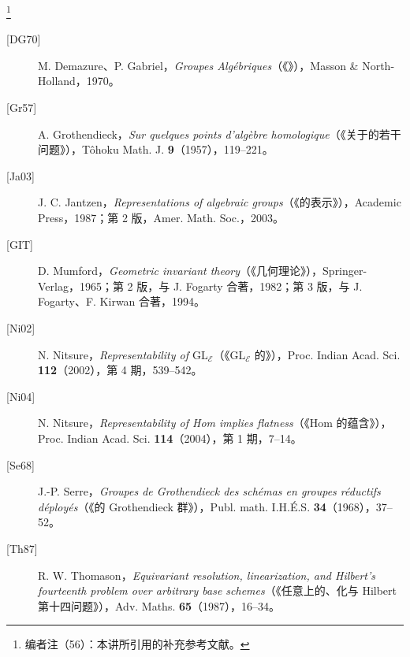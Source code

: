 \footnote{编者注（56）：本讲所引用的补充参考文献。}
\begin{description}
\item[{[DG70]}] M. Demazure、P. Gabriel，\emph{Groupes Algébriques}（《》），Masson \& North-Holland，1970。
\item[{[Gr57]}] A. Grothendieck，\emph{Sur quelques points d'algèbre homologique}（《关于的若干问题》），Tôhoku Math. J. \textbf{9}（1957），119--221。
\item[{[Ja03]}] J. C. Jantzen，\emph{Representations of algebraic groups}（《的表示》），Academic Press，1987；第 2 版，Amer. Math. Soc.，2003。
\item[{[GIT]}] D. Mumford，\emph{Geometric invariant theory}（《几何理论》），Springer-Verlag，1965；第 2 版，与 J. Fogarty 合著，1982；第 3 版，与 J. Fogarty、F. Kirwan 合著，1994。
\item[{[Ni02]}] N. Nitsure，\emph{Representability of $\mathrm{GL}_{\mathcal E}$}（《$\mathrm{GL}_{\mathcal E}$ 的》），Proc. Indian Acad. Sci. \textbf{112}（2002），第 4 期，539--542。
\item[{[Ni04]}] N. Nitsure，\emph{Representability of Hom implies flatness}（《Hom 的蕴含》），Proc. Indian Acad. Sci. \textbf{114}（2004），第 1 期，7--14。
\item[{[Se68]}] J.-P. Serre，\emph{Groupes de Grothendieck des schémas en groupes réductifs déployés}（《的 Grothendieck 群》），Publ. math. I.H.É.S. \textbf{34}（1968），37--52。
\item[{[Th87]}] R. W. Thomason，\emph{Equivariant resolution, linearization, and Hilbert's fourteenth problem over arbitrary base schemes}（《任意上的、化与 Hilbert 第十四问题》），Adv. Maths. \textbf{65}（1987），16--34。
\end{description}
